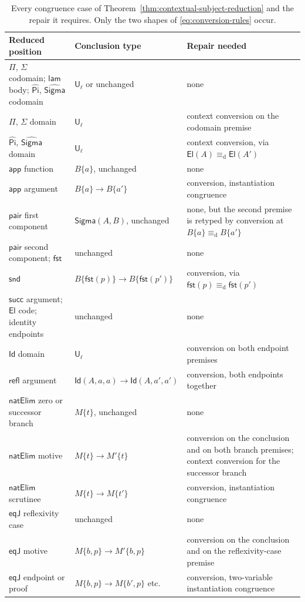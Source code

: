 \documentclass[10pt,reqno]{amsart}
\newcommand{\Sort}{\mathsf{U}}
\newcommand{\SigmaTy}{\mathsf{Sigma}}
\newcommand{\Lam}{\mathsf{lam}}
\newcommand{\App}{\mathsf{app}}
\newcommand{\Pair}{\mathsf{pair}}
\newcommand{\Fst}{\mathsf{fst}}
\newcommand{\Snd}{\mathsf{snd}}
\newcommand{\Succ}{\mathsf{succ}}
\newcommand{\CodePi}{\widehat{\mathsf{Pi}}}
\newcommand{\CodeSigma}{\widehat{\mathsf{Sigma}}}
\newcommand{\El}{\mathsf{El}}
\newcommand{\IdTy}{\mathsf{Id}}
\newcommand{\Refl}{\mathsf{refl}}
\newcommand{\EqJ}{\mathsf{eqJ}}
\newcommand{\defeq}{\mathrel{\equiv_{\mathrm d}}}
\begin{document}
\begin{table}[t]
\centering
\small
\renewcommand{\arraystretch}{1.18}
\begin{tabular}{>{\raggedright\arraybackslash}p{}
                >{\raggedright\arraybackslash}p{}
                >{\raggedright\arraybackslash}p{}}
\toprule
Reduced position & Conclusion type & Repair needed\\
\midrule
\(\Pi\), \(\Sigma\) codomain; \(\Lam\) body; \(\CodePi\), \(\CodeSigma\)
 codomain
 & \(\Sort_\ell\) or unchanged
 & none\\
\(\Pi\), \(\Sigma\) domain
 & \(\Sort_\ell\)
 & context conversion on the codomain premise\\
\(\CodePi\), \(\CodeSigma\) domain
 & \(\Sort_\ell\)
 & context conversion, via \(\El(A)\defeq\El(A')\)\\
\(\App\) function
 & \(B\{a\}\), unchanged
 & none\\
\(\App\) argument
 & \(B\{a\}\to B\{a'\}\)
 & conversion, instantiation congruence\\
\(\Pair\) first component
 & \(\SigmaTy(A,B)\), unchanged
 & none, but the second premise is retyped by conversion at
   \(B\{a\}\defeq B\{a'\}\)\\
\(\Pair\) second component; \(\Fst\)
 & unchanged
 & none\\
\(\Snd\)
 & \(B\{\Fst(p)\}\to B\{\Fst(p')\}\)
 & conversion, via \(\Fst(p)\defeq\Fst(p')\)\\
\(\Succ\) argument; \(\El\) code; identity endpoints
 & unchanged
 & none\\
\(\IdTy\) domain
 & \(\Sort_\ell\)
 & conversion on both endpoint premises\\
\(\Refl\) argument
 & \(\IdTy(A,a,a)\to\IdTy(A,a',a')\)
 & conversion, both endpoints together\\
\(\mathsf{natElim}\) zero or successor branch
 & \(M\{t\}\), unchanged
 & none\\
\(\mathsf{natElim}\) motive
 & \(M\{t\}\to M'\{t\}\)
 & conversion on the conclusion and on both branch premises; context
   conversion for the successor branch\\
\(\mathsf{natElim}\) scrutinee
 & \(M\{t\}\to M\{t'\}\)
 & conversion, instantiation congruence\\
\(\EqJ\) reflexivity case
 & unchanged
 & none\\
\(\EqJ\) motive
 & \(M\{b,p\}\to M'\{b,p\}\)
 & conversion on the conclusion and on the reflexivity-case premise\\
\(\EqJ\) endpoint or proof
 & \(M\{b,p\}\to M\{b',p\}\) etc.
 & conversion, two-variable instantiation congruence\\
\bottomrule
\end{tabular}
\caption{Every congruence case of
Theorem~\ref{thm:contextual-subject-reduction} and the repair it requires.  Only
the two shapes of \eqref{eq:conversion-rules} occur.}
\label{tab:sr-cases}
\end{table}
\end{document}
